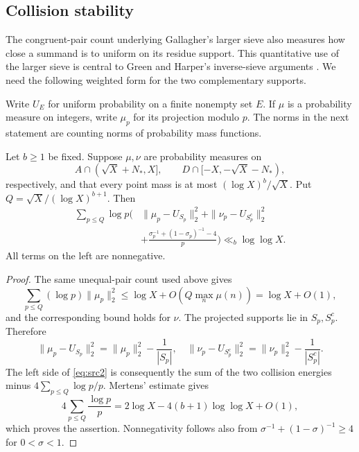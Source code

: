 \subsection{Collision stability}

The congruent-pair count underlying Gallagher's larger sieve
\cite{Gallagher1971} also measures how close a summand is to uniform
on its residue support.  This quantitative use of the larger sieve is
central to Green and Harper's inverse-sieve arguments
\cite[Equation~(2.1) and Lemma~2.4]{GreenHarper}.
We need the following weighted form for the two complementary supports.

Write $U_E$ for uniform probability on a finite nonempty set $E$.
If $\mu$ is a probability measure on integers, write $\mu_p$ for its
projection modulo $p$. The norms in the next statement are counting
norms of probability mass functions.

\begin{lemma}\label{lem:collision}
Let $b\ge1$ be fixed. Suppose $\mu,\nu$ are probability measures on
\[
 A\cap(\sqrt X+N_*,X],\qquad
 D\cap[-X,-\sqrt X-N_*),
\]
respectively, and that every point mass is at most
$(\log X)^b/\sqrt X$. Put $Q=\sqrt X/(\log X)^{b+1}$. Then
\begin{equation}\label{eq:src2}
\begin{split}
 \sum_{p\le Q}\log p\bigg(
 &\|\mu_p-U_{S_p}\|_2^2+\|\nu_p-U_{S_p^c}\|_2^2\\
 &+\frac{\sigma_p^{-1}+(1-\sigma_p)^{-1}-4}{p}
 \bigg)\ll_b\log\log X.
\end{split}
\end{equation}
All terms on the left are nonnegative.
\end{lemma}

\begin{proof}
The same unequal-pair count used above gives
\[
 \sum_{p\le Q}(\log p)\|\mu_p\|_2^2
 \le\log X+O\left(Q\max_n\mu(n)\right)
 =\log X+O(1),
\]
and the corresponding bound holds for $\nu$.
The projected supports lie in $S_p,S_p^c$. Therefore
\[
 \|\mu_p-U_{S_p}\|_2^2=\|\mu_p\|_2^2-\frac1{|S_p|},
 \quad
 \|\nu_p-U_{S_p^c}\|_2^2=\|\nu_p\|_2^2-\frac1{|S_p^c|}.
\]
The left side of \eqref{eq:src2} is consequently the sum of the two
collision energies minus $4\sum_{p\le Q}\log p/p$. Mertens' estimate
gives
\[
 4\sum_{p\le Q}\frac{\log p}{p}
 =2\log X-4(b+1)\log\log X+O(1),
\]
which proves the assertion. Nonnegativity follows also from
$\sigma^{-1}+(1-\sigma)^{-1}\ge4$ for $0<\sigma<1$.
\end{proof}

